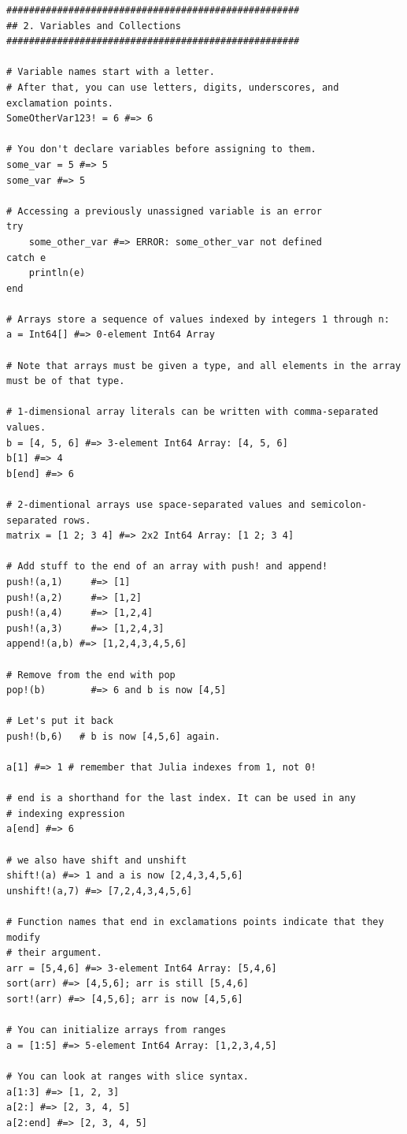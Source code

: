 \documentclass[11pt,a4paper,oneside]{report}
\begin{document}
\begin{verbatim}
####################################################
## 2. Variables and Collections
####################################################

# Variable names start with a letter.
# After that, you can use letters, digits, underscores, and exclamation points.
SomeOtherVar123! = 6 #=> 6

# You don't declare variables before assigning to them.
some_var = 5 #=> 5
some_var #=> 5

# Accessing a previously unassigned variable is an error
try
    some_other_var #=> ERROR: some_other_var not defined
catch e
    println(e)
end

# Arrays store a sequence of values indexed by integers 1 through n:
a = Int64[] #=> 0-element Int64 Array

# Note that arrays must be given a type, and all elements in the array
must be of that type.

# 1-dimensional array literals can be written with comma-separated values.
b = [4, 5, 6] #=> 3-element Int64 Array: [4, 5, 6]
b[1] #=> 4
b[end] #=> 6

# 2-dimentional arrays use space-separated values and semicolon-separated rows.
matrix = [1 2; 3 4] #=> 2x2 Int64 Array: [1 2; 3 4]

# Add stuff to the end of an array with push! and append!
push!(a,1)     #=> [1]
push!(a,2)     #=> [1,2]
push!(a,4)     #=> [1,2,4]
push!(a,3)     #=> [1,2,4,3]
append!(a,b) #=> [1,2,4,3,4,5,6]

# Remove from the end with pop
pop!(b)        #=> 6 and b is now [4,5]

# Let's put it back
push!(b,6)   # b is now [4,5,6] again.

a[1] #=> 1 # remember that Julia indexes from 1, not 0!

# end is a shorthand for the last index. It can be used in any
# indexing expression
a[end] #=> 6

# we also have shift and unshift
shift!(a) #=> 1 and a is now [2,4,3,4,5,6]
unshift!(a,7) #=> [7,2,4,3,4,5,6]

# Function names that end in exclamations points indicate that they modify
# their argument.
arr = [5,4,6] #=> 3-element Int64 Array: [5,4,6]
sort(arr) #=> [4,5,6]; arr is still [5,4,6]
sort!(arr) #=> [4,5,6]; arr is now [4,5,6]

# You can initialize arrays from ranges
a = [1:5] #=> 5-element Int64 Array: [1,2,3,4,5]

# You can look at ranges with slice syntax.
a[1:3] #=> [1, 2, 3]
a[2:] #=> [2, 3, 4, 5]
a[2:end] #=> [2, 3, 4, 5]


\end{verbatim}
\end{document}
